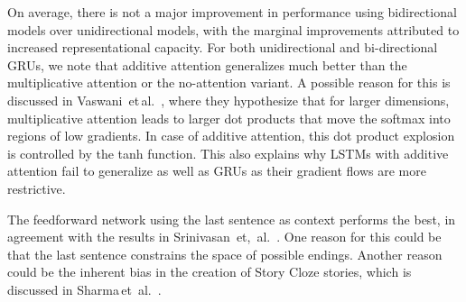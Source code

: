 \documentclass{article}
\begin{document}
On average, there is not a major improvement in performance using bidirectional models over unidirectional models, with the marginal improvements attributed to increased representational capacity. For both unidirectional and bi-directional GRUs, we note that additive attention generalizes much better than the multiplicative attention or the no-attention variant. A possible reason for this is discussed in Vaswani\, et\,al.\ \citep{AllYouNeed}, where they hypothesize that for larger dimensions, multiplicative attention leads to larger dot products that move the softmax into regions of low gradients. In case of additive attention, this dot product explosion is controlled by the tanh function. This also explains why LSTMs with additive attention fail to generalize as well as GRUs as their gradient flows are more restrictive.

The feedforward network using the last sentence as context performs the best, in agreement with the results in Srinivasan\, et,\ al.\ \citep{Srinivasan2018ATest}. One reason for this could be that the last sentence constrains the space of possible endings. Another reason could be the inherent bias in the creation of Story Cloze stories, which is discussed in Sharma\,et\, al.\ \citep{sharma-etal-2018-tackling}.
\end{document}
